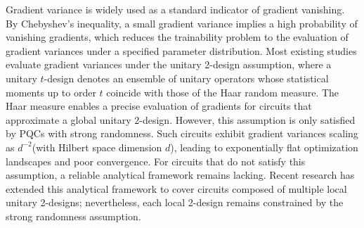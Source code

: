 \documentclass[%
 reprint,
 superscriptaddress,
 amsmath,amssymb,
 aps, prl, twocolumn, showpacs,
]{revtex4-2}
\begin{document}
 Gradient variance is widely used as a standard indicator of gradient vanishing. By Chebyshev’s inequality, a small gradient variance implies a high probability of vanishing gradients\cite{mcclean2018barren}, which reduces the trainability problem to the evaluation of gradient variances under a specified parameter distribution. Most existing studies evaluate gradient variances under the unitary 2-design assumption\cite{cerezo2021cost,ortiz2021entanglement,fontana2024characterizing,cunningham2025investigating}, where a unitary $t$-design denotes an ensemble of unitary operators whose statistical moments up to order $t$ coincide with those of the Haar random measure. The Haar measure enables a precise evaluation of gradients for circuits that approximate a global unitary 2-design. However, this assumption is only satisfied by PQCs with strong randomness. Such circuits exhibit gradient variances scaling as $d^{-2}$(with Hilbert space dimension $d$), leading to exponentially flat optimization landscapes and poor convergence. For circuits that do not satisfy this assumption, a reliable analytical framework remains lacking.
 Recent research has extended this analytical framework to cover circuits composed of multiple local unitary 2-designs; nevertheless, each local 2-design remains constrained by the strong randomness assumption\cite{pesah2021absence, schumann2024emergence}.

\end{document}
